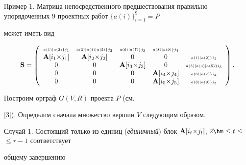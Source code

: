 \smallskip

{\small \sc Пример 1.} Матрица непосредственного предшествования правильно упорядоченных 9 проектных работ $\{a(i)\}^{9}_{i=1}=P$

может иметь вид


$$

{\bf S}= \left(

\begin{array}{ccccc}

\scriptscriptstyle a(1)| a(2)\}j_{1} & \scriptscriptstyle a(3)|

a(4)| a(5)\}j_{2} &\scriptscriptstyle a(6)|

a(7)\}j_{3} & \scriptscriptstyle a(8)| a(9)\}j_{4} &\\

{\bf A}[i_{1}{\times} j_{1}]& {\bf A}[i_{2}{\times} j_{2}]&0&0 &\scriptscriptstyle a(1)| a(2)\}i_{2}\\

0&0&{\bf A}[i_{3}{\times} j_{3}]&0 &\scriptscriptstyle a(3)| a(4)| a(5)\}i_{3}\\

0&0&0&{\bf A}[i_{4}{\times} j_{4}] &\scriptscriptstyle a(6)| a(7)\}i_{4}\\

0&0&0&{\bf A}[i_{5}{\times} j_{5}] &\scriptscriptstyle a(8)|

a(9)\}i_{5}

\end{array}

\right).

$$



\smallskip



 Построим орграф $G(V,R)$ проекта $P$ (см.

[3]). Определим сначала множество вершин $V$ следующим образом.




\smallskip

{\small \sc Случай 1.} Состоящий только из единиц ({\em единичный}) блок ${\bf A}[i_t {\times} j_t ]$, \mbox{$2 \hm \leq t \leq$} $\leq r-1$ соответствует

общему завершению

